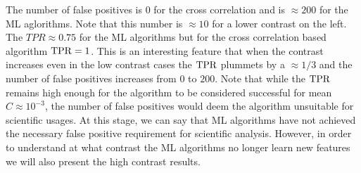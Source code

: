 The number of false positives is $0$ for the cross correlation and is $\approx 200$ for the ML aglorithms.
Note that this number is $\approx 10$ for a lower contrast on the left.
The $TPR\approx0.75$ for the ML algorithms but for the cross correlation based algorithm $\rm{TPR}=1$.
This is an interesting feature that when the contrast increases even in the low contrast cases the $\rm{TPR}$ plummets by a $\approx1/3$ and the number of false positives increases from $0$ to $200$.
Note that while the $\rm{TPR}$ remains high enough for the algorithm to be considered successful for mean $C\approx10^{-3}$, the number of false positives would deem the algorithm unsuitable for scientific usages.
At this stage, we can  say that ML algorithms have not achieved the necessary false positive requirement for scientific analysis.
However, in order to understand at what contrast the ML algorithms no longer learn new features we will also present the high contrast results.
